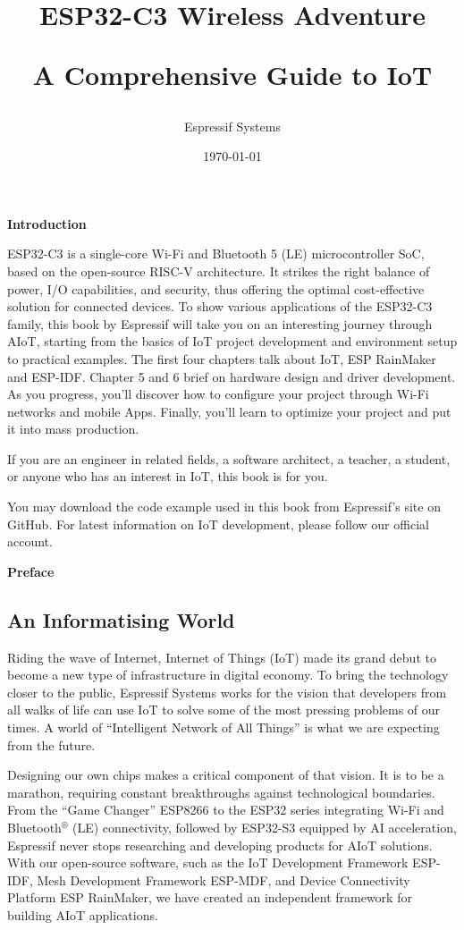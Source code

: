 \documentclass[a4paper,12pt,openany]{book}
\title{ESP32-C3 Wireless Adventure\par \Large A Comprehensive Guide to IoT}
\author{Espressif Systems}
\date{\today}
\begin{document}
\maketitle

\tableofcontents

\newpage
\begin{center}
    \textcolor{Title}{\large\bfseries Introduction}
\end{center}
ESP32-C3 is a single-core Wi-Fi and Bluetooth 5 (LE) microcontroller SoC, based on the open-source RISC-V architecture. It strikes the right balance of power, I/O capabilities, and security, thus offering the optimal cost-effective solution for connected devices. To show various applications of the ESP32-C3 family, this book by Espressif will take you on an interesting journey through AIoT, starting from the basics of IoT project development and environment setup to practical examples. The first four chapters talk about IoT, ESP RainMaker and ESP-IDF. Chapter 5 and 6 brief on hardware design and driver development. As you progress, you’ll discover how to configure your project through Wi-Fi networks and mobile Apps. Finally, you’ll learn to optimize your project and put it into mass production.

If you are an engineer in related fields, a software architect, a teacher, a student, or anyone who has an interest in IoT, this book is for you.

You may download the code example used in this book from Espressif’s site on GitHub. For latest information on IoT development, please follow our official account.

\newpage
\begin{center}
    \textcolor{Title}{\LARGE\bfseries Preface}
\end{center}

\subsection*{An Informatising World}
Riding the wave of Internet, Internet of Things (IoT) made its grand debut to become a new type of infrastructure in digital economy. To bring the technology closer to the public, Espressif Systems works for the vision that developers from all walks of life can use IoT to solve some of the most pressing problems of our times. A world of “Intelligent Network of All Things” is what we are expecting from the future.

Designing our own chips makes a critical component of that vision. It is to be a marathon, requiring constant breakthroughs against technological boundaries. From the “Game Changer” ESP8266 to the ESP32 series integrating Wi-Fi and Bluetooth$^\circledR$ (LE) connectivity, followed by ESP32-S3 equipped by AI acceleration, Espressif never stops researching and developing products for AIoT solutions. With our open-source software, such as the IoT Development Framework ESP-IDF, Mesh Development Framework ESP-MDF, and Device Connectivity Platform ESP RainMaker, we have created an independent framework for building AIoT applications.
\end{document}
